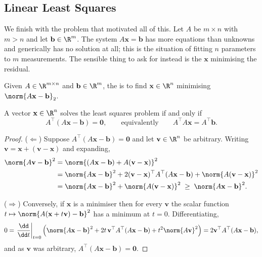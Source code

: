 \subsection{Linear Least Squares}

We finish with the problem that motivated all of this. Let $A$ be $m\times n$ with $m > n$ and let $\mathbf b\in\R^m$. The system $A\mathbf x = \mathbf b$ has more equations than unknowns and generically has no solution at all; this is the situation of fitting $n$ parameters to $m$ measurements. The sensible thing to ask for instead is the $\mathbf x$ minimising the residual.

\begin{definition}
  Given $A \in \R^{m\times n}$ and $\mathbf b\in\R^m$, the  is to find $\mathbf x\in\R^n$ minimising $\norm{A\mathbf x - \mathbf b}_2$.
\end{definition}

\begin{theorem}\label{thm:normaleq}
  A vector $\mathbf x\in\R^n$ solves the least squares problem if and only if
  $$
  A^\top(A\mathbf x - \mathbf b) = \mathbf 0, \qquad \text{equivalently} \qquad A^\top A\mathbf x = A^\top \mathbf b .
  $$
\end{theorem}
\begin{proof}
  ($\Leftarrow$) Suppose $A^\top(A\mathbf x - \mathbf b) = \mathbf 0$ and let $\mathbf v\in\R^n$ be arbitrary. Writing $\mathbf v = \mathbf x + (\mathbf v - \mathbf x)$ and expanding,
  \begin{align*}
    \norm{A\mathbf v - \mathbf b}^2 &= \norm{(A\mathbf x - \mathbf b) + A(\mathbf v - \mathbf x)}^2\\
    &= \norm{A\mathbf x - \mathbf b}^2 + 2(\mathbf v - \mathbf x)^\top A^\top(A\mathbf x - \mathbf b) + \norm{A(\mathbf v-\mathbf x)}^2\\
    &= \norm{A\mathbf x - \mathbf b}^2 + \norm{A(\mathbf v - \mathbf x)}^2 \; \geq \; \norm{A\mathbf x - \mathbf b}^2 .
  \end{align*}

  ($\Rightarrow$) Conversely, if $\mathbf x$ is a minimiser then for every $\mathbf v$ the scalar function $t \mapsto \norm{A(\mathbf x + t\mathbf v) - \mathbf b}^2$ has a minimum at $t = 0$. Differentiating,
  $$
  0 = \left.\frac{\dd}{\dd t}\right|_{t=0}\left(\norm{A\mathbf x - \mathbf b}^2 + 2t\,\mathbf v^\top A^\top(A\mathbf x - \mathbf b) + t^2\norm{A\mathbf v}^2\right) = 2\mathbf v^\top A^\top(A\mathbf x - \mathbf b),
  $$
  and as $\mathbf v$ was arbitrary, $A^\top(A\mathbf x-\mathbf b) = \mathbf 0$.
\end{proof}

